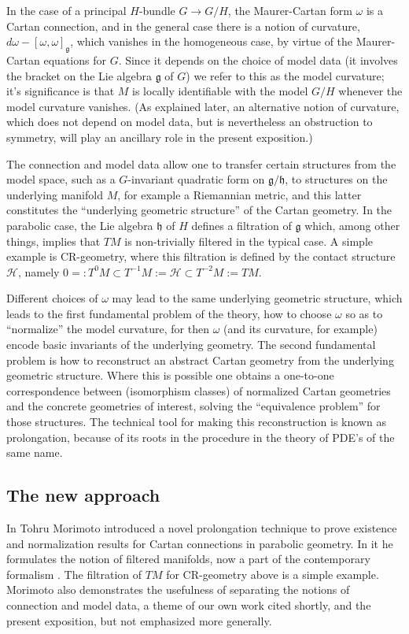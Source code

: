 \documentclass[leqno,12pt]{amsart} %
\begin{document}
In the case of a principal $H$-bundle $G \rightarrow G/H$, the Maurer-Cartan form $\omega$
is a Cartan connection, and in the general case there is a notion of curvature,
$d \omega - [\omega,\omega]_{\mathfrak g}$, which vanishes in the homogeneous case, by
virtue of the Maurer-Cartan equations for $G$. Since it depends on the choice of model
data (it involves the bracket on the Lie algebra ${\mathfrak g} $ of $G$) we refer to this
as the {\df model curvature}; it's significance is that $M$ is locally identifiable with
the model $G/H$ whenever the model curvature vanishes. (As explained later, an alternative
notion of curvature, which does not depend on model data, but is nevertheless an
obstruction to symmetry, will play an ancillary role in the present exposition.)

The connection and model data allow one to transfer certain structures from the model
space, such as a $G$-invariant quadratic form on ${\mathfrak g} /{\mathfrak h} $, to
structures on the underlying manifold $M$, for example a Riemannian metric, and this
latter constitutes the ``underlying geometric structure'' of the Cartan geometry. In the
parabolic case, the Lie algebra ${\mathfrak h} $ of $H$ defines a filtration of
${\mathfrak g} $ which, among other things, implies that $TM$ is non-trivially filtered in
the typical case. A simple example is CR-geometry, where this filtration is defined by the
contact structure ${\mathcal H} $, namely
$0=:T^0M \subset T^{-1}M:={\mathcal H} \subset T^{-2}M:=TM$.

Different choices of $\omega $ may lead to the same underlying geometric structure, which
leads to the first fundamental problem of the theory, how to choose $\omega $ so as to
``normalize'' the model curvature, for then $\omega$ (and its curvature, for example)
encode basic invariants of the underlying geometry. The second fundamental problem is how
to reconstruct an abstract Cartan geometry from the underlying geometric structure.  Where
this is possible one obtains a one-to-one correspondence between (isomorphism classes) of
normalized Cartan geometries and the concrete geometries of interest, solving the
``equivalence problem'' for those structures. The technical tool for making this
reconstruction is known as prolongation, because of its roots in the procedure in the
theory of PDE's of the same name.

\subsection{The new approach}
In \cite{Morimoto_93} Tohru Morimoto introduced a novel prolongation technique to prove
existence and normalization results for Cartan connections in parabolic geometry. In it he
formulates the notion of filtered manifolds, now a part of the contemporary formalism
\cite{Cap_Slovak_09}. The filtration of $TM$ for CR-geometry above is a simple
example. Morimoto also demonstrates the usefulness of separating the notions of connection
and model data, a theme of our own work cited shortly, and the present exposition, but not
emphasized more generally.
\end{document}
